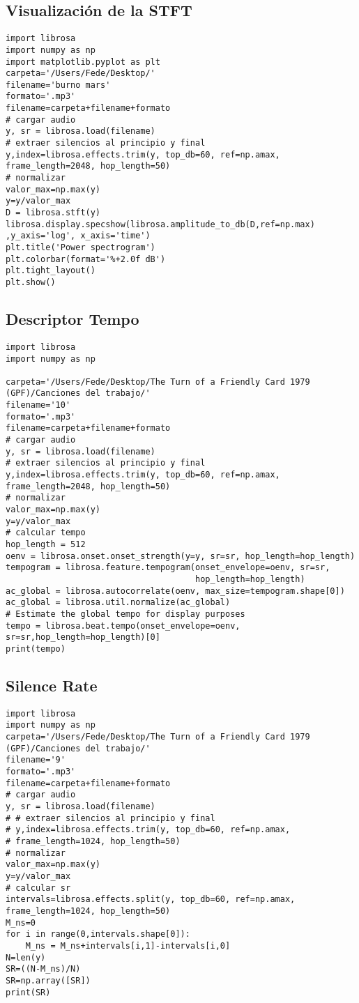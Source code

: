 \documentclass[]{article}
\begin{document}
\subsection{Visualización de la STFT}
\label{stft}
\begin{verbatim}
import librosa
import numpy as np
import matplotlib.pyplot as plt
carpeta='/Users/Fede/Desktop/'
filename='burno mars'
formato='.mp3'
filename=carpeta+filename+formato
# cargar audio
y, sr = librosa.load(filename)
# extraer silencios al principio y final
y,index=librosa.effects.trim(y, top_db=60, ref=np.amax, frame_length=2048, hop_length=50)
# normalizar
valor_max=np.max(y)
y=y/valor_max
D = librosa.stft(y)
librosa.display.specshow(librosa.amplitude_to_db(D,ref=np.max)
,y_axis='log', x_axis='time')
plt.title('Power spectrogram')
plt.colorbar(format='%+2.0f dB')
plt.tight_layout()
plt.show()
\end{verbatim}

\subsection{Descriptor Tempo}
\label{tempo}
\begin{verbatim}
import librosa
import numpy as np

carpeta='/Users/Fede/Desktop/The Turn of a Friendly Card 1979 (GPF)/Canciones del trabajo/'
filename='10'
formato='.mp3'
filename=carpeta+filename+formato
# cargar audio
y, sr = librosa.load(filename)
# extraer silencios al principio y final
y,index=librosa.effects.trim(y, top_db=60, ref=np.amax, frame_length=2048, hop_length=50)
# normalizar
valor_max=np.max(y)
y=y/valor_max
# calcular tempo
hop_length = 512
oenv = librosa.onset.onset_strength(y=y, sr=sr, hop_length=hop_length)
tempogram = librosa.feature.tempogram(onset_envelope=oenv, sr=sr,
                                      hop_length=hop_length)
ac_global = librosa.autocorrelate(oenv, max_size=tempogram.shape[0])
ac_global = librosa.util.normalize(ac_global)
# Estimate the global tempo for display purposes
tempo = librosa.beat.tempo(onset_envelope=oenv, sr=sr,hop_length=hop_length)[0]
print(tempo)
\end{verbatim}
\subsection{Silence Rate}
\label{silence rate}
\begin{verbatim}
import librosa
import numpy as np
carpeta='/Users/Fede/Desktop/The Turn of a Friendly Card 1979 (GPF)/Canciones del trabajo/'
filename='9'
formato='.mp3'
filename=carpeta+filename+formato
# cargar audio
y, sr = librosa.load(filename)
# # extraer silencios al principio y final
# y,index=librosa.effects.trim(y, top_db=60, ref=np.amax,
# frame_length=1024, hop_length=50)
# normalizar
valor_max=np.max(y)
y=y/valor_max
# calcular sr
intervals=librosa.effects.split(y, top_db=60, ref=np.amax,
frame_length=1024, hop_length=50)
M_ns=0
for i in range(0,intervals.shape[0]):
    M_ns = M_ns+intervals[i,1]-intervals[i,0]
N=len(y)
SR=((N-M_ns)/N)
SR=np.array([SR])
print(SR)
\end{verbatim}
\end{document}
